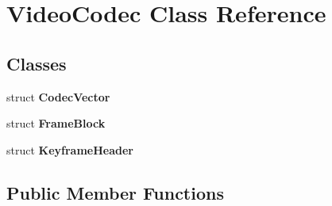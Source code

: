 \hypertarget{classVideoCodec}{\section{Video\-Codec Class Reference}
\label{classVideoCodec}
}
\subsection*{Classes}
\begin{DoxyCompactItemize}
\item 
struct {\bfseries Codec\-Vector}
\item 
struct {\bfseries Frame\-Block}
\item 
struct {\bfseries Keyframe\-Header}
\end{DoxyCompactItemize}
\subsection*{Public Member Functions}
